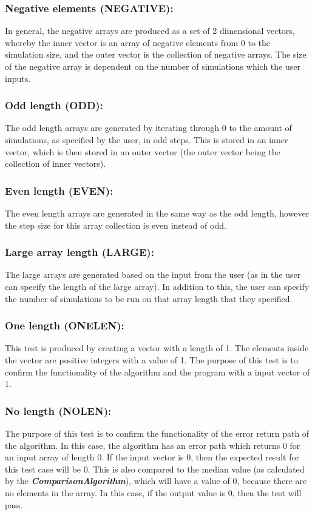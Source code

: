 \documentclass[12pt]{article}
\begin{document}
\subsubsection{Negative elements (NEGATIVE): }
In general, the negative arrays are produced as a set of 2 dimensional vectors, whereby the inner vector is an array of negative elements from 0 to the simulation size, and the outer vector is the collection of negative arrays. The size of the negative array is dependent on the number of simulations which the user inputs. 
\subsubsection{Odd length (ODD): }
The odd length arrays are generated by iterating through 0 to the amount of simulations, as specified by the user, in odd steps. This is stored in an inner vector, which is then stored in an outer vector (the outer vector being the collection of inner vectors). 
\subsubsection{Even length (EVEN): }
The even length arrays are generated in the same way as the odd length, however the step size for this array collection is even instead of odd. 
\subsubsection{Large array length (LARGE): }
The large arrays are generated based on the input from the user (as in the user can specify the length of the large array). In addition to this, the user can specify the number of simulations to be run on that array length that they specified. 
\subsubsection{One length (ONELEN): }
This test is produced by creating a vector with a length of 1. The elements inside the vector are positive integers with a value of 1. The purpose of this test is to confirm the functionality of the algorithm and the program with a input vector of 1.

\subsubsection{No length (NOLEN): }
The purpose of this test is to confirm the functionality of the error return path of the algorithm. In this case, the algorithm has an error path which returns 0 for an input array of length 0. If the input vector is 0, then the expected result for this test case will be 0. This is also compared to the median value (as calculated by the \textbf{\textit{ComparisonAlgorithm}}), which will have a value of 0, because there are no elements in the array. In this case, if the output value is 0, then the test will pass.
\end{document}
